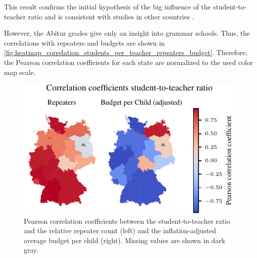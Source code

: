 This result confirms the initial hypothesis of the big influence of the student-to-teacher ratio and is consistent with studies in other countries \cite{kasau_onesmus_mulei_pupil-teacher_2016,koc_impact_2015,dickson_economic_1984}.

However, the Abitur grades give only an insight into grammar schools. 
Thus, the correlations with repeaters and budgets are shown in \autoref{fig:heatmap_correlation_students_per_teacher_repeaters_budget}. 
Therefore, the Pearson correlation coefficients for each state are normalized to the used color map scale.

\begin{figure}[ht]
    \centering
    \includegraphics{fig/fig_heatmap_correlation_students_per_teacher_repeaters_budget.pdf}
    \caption{Pearson correlation coefficients between the student-to-teacher ratio and the relative repeater count (left) and the inflation-adjusted average budget per child (right). Missing values are shown in \textcolor{TUdark}{dark gray}.}
    \label{fig:heatmap_correlation_students_per_teacher_repeaters_budget}
\end{figure}

